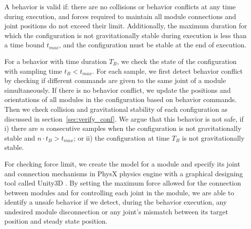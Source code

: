 \documentclass[graybox]{svmult}
\begin{document}
\begin{definition}
A behavior is valid if: there are no collisions or behavior conflicts at any time
during execution, and forces required to maintain all module connections and joint positions do not exceed their limit.
Additionally, the maximum duration for which the configuration is not
gravitationally stable during execution is less than a time bound $t_{max}$, and the configuration must be stable at the end of execution.
\end{definition}

For a behavior with time duration  $T_B$, we check the state of the configuration with sampling time $t_B<t_{max}$. For each sample, we first detect behavior conflict by checking if different commands are given to the same joint of a module simultaneously. If there is no behavior conflict, we update the positions and orientations of all modules in the configuration based on behavior commands. Then we check collision and gravitational stability of each configuration as discussed in section~\ref{sec:verify_conf}. We argue that this behavior is not safe, if i) there are $n$ consecutive samples when the configuration is not gravitationally stable and $n\cdot t_B > t_{max}$; or ii) the configuration at time $T_B$ is not gravitationally stable.

For checking force limit, we create the model for a module and specify its joint and connection mechanisms in PhysX \cite{PhysX} physics engine with a graphical designing tool called Unity3D \cite{Unity}. By setting the maximum force allowed for the connection between modules and for controlling each joint in the module, we are able to identify a unsafe behavior if we detect, during the behavior execution, any undesired module disconnection or any joint's mismatch between its target position and steady state position.
\end{document}
